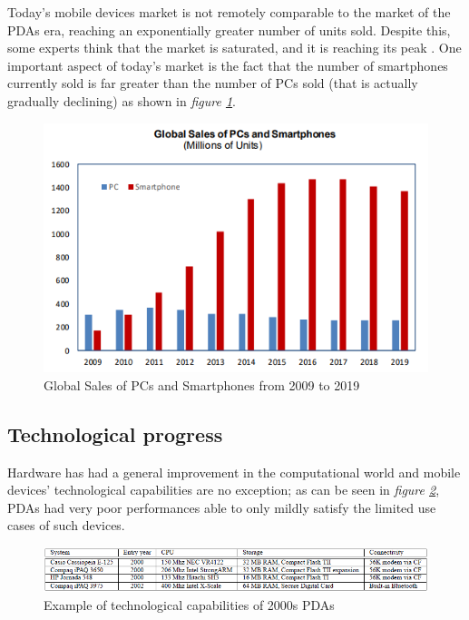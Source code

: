 Today's mobile devices market is not remotely comparable to the market of the PDAs era, reaching an exponentially greater number of units sold. Despite this, some experts think that the market is saturated, and it is reaching its peak \cite{smartphones_sales}. One important aspect of today's market is the fact that the number of smartphones currently sold is far greater than the number of PCs sold (that is actually gradually declining) as shown in \textit{figure \ref{fig:global_sales_of_pcs_and_smartphones}}.

\begin{figure}[!ht]
    \centering
    \includegraphics[scale=0.9]{document/chapters/chapter_1/images/global_sales_of_pcs_and_smartphones.png}
    \caption{Global Sales of PCs and Smartphones from 2009 to 2019 \cite{smartphones_sales}}
    \label{fig:global_sales_of_pcs_and_smartphones}
\end{figure}

\subsection{Technological progress}\label{technological_progress}
Hardware has had a general improvement in the computational world and mobile devices' technological capabilities are no exception; as can be seen in \textit{figure \ref{fig:pda_capabilities}}, PDAs had very poor performances able to only mildly satisfy the limited use cases of such devices. 

\begin{figure}[!ht]
    \centering
    \includegraphics[scale=0.77]{document/chapters/chapter_1/images/pda_capabilities.png}
    \caption{Example of technological capabilities of 2000s PDAs \cite{integrating_mobile_devices_into_grid}}
    \label{fig:pda_capabilities}
\end{figure}

